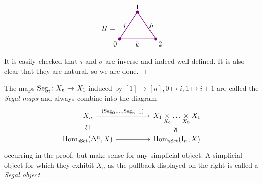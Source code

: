         \begin{equation*}
            \begin{tikzpicture}[
                scale=0.9, 
                thick, 
                color=violet, 
                every node/.style={text=black},
                dot/.style={circle, fill=violet, inner sep=1.5pt, outer sep=0pt}
            ]

                \coordinate (O) at (0,0);       %
                \coordinate (A) at (1, 1.5);    %
                \coordinate (B) at (2, 0);      %

                \draw (O) -- node[left] {$i$} (A) 
                    -- node[right] {$h$} (B) 
                    -- node[below] {$k$} cycle;

                \node[dot] at (O) {};
                \node[dot] at (A) {};
                \node[dot] at (B) {};

                \node[below left] at (O) {0};
                \node[above] at (A) {1};
                \node[below right] at (B) {2};

                \node[scale=1.0] at (-0.6, 0.6) {$H =$};

            \end{tikzpicture}        
        \end{equation*}
        It is easily checked that $\tau$ and $\sigma$ are inverse and indeed well-defined. It is also clear that they are natural, so we are done.\hfill$\Box$

        The maps $\operatorname{Seg}_i \colon X_n \to X_1$ induced by $[1] \to [n], 0 \mapsto i, 1 \mapsto i + 1$ are called the \emph{Segal maps} and always combine into the diagram
        \begin{equation*}
            \begin{tikzcd}[row sep=small, column sep=huge]
                X_n \arrow[r, "{(\Seg_0, \ldots, \Seg_{n - 1})}"] \arrow[d, phantom, "\cong" rotate=90] & \longpb{X_1}{X_0} \arrow[d, phantom, "\cong" rotate=90] \\
                \Hom_{\sSet}(\Delta^n, X) \arrow[r] & \Hom_{\sSet}(\II_n, X)
            \end{tikzcd}
        \end{equation*}
        occurring in the proof, but make sense for any simplicial object. A simplicial object for which they exhibit $X_n$ as the pullback displayed on the right is called a \emph{Segal object}.

